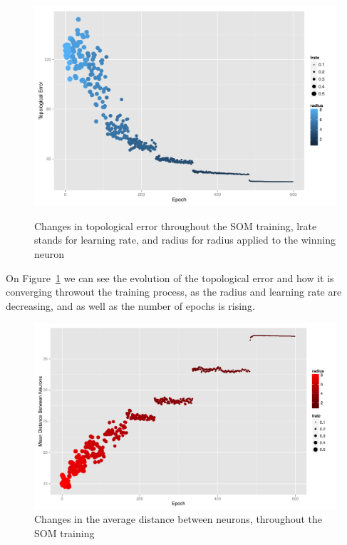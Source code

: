 \begin{figure}[h!]
  \includegraphics[scale=0.6]{./plots/som/topological_error.pdf}
  \label{fig:top_error}
  \caption{Changes in topological error throughout the SOM training, lrate stands for learning rate, and radius for radius applied to the winning neuron}
\end{figure}

On Figure~\ref{fig:top_error} we can see the evolution of the topological error and how it is converging throwout the training process, as the radius and learning rate are decreasing, and as well as the number of epochs is rising. 

\begin{figure}[h!]
  \centerline{\includegraphics[scale=0.6]{./plots/som/average_distance.pdf}}
  \label{fig:avg_dist}
  \caption{Changes in the average distance between neurons, throughout the SOM training}
\end{figure}

